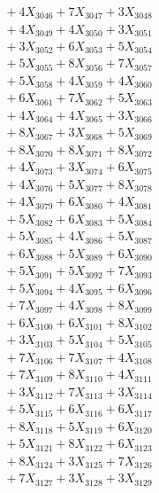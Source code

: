 \documentclass[a4paper,10pt]{article}
\begin{document}
{\begin{align}
&\;  + 4 X_{3046} + 7 X_{3047} + 3 X_{3048} \\[0.3ex]
&\;  + 4 X_{3049} + 4 X_{3050} + 3 X_{3051} \\[0.3ex]
&\;  + 3 X_{3052} + 6 X_{3053} + 5 X_{3054} \\[0.3ex]
&\;  + 5 X_{3055} + 8 X_{3056} + 7 X_{3057} \\[0.3ex]
&\;  + 5 X_{3058} + 4 X_{3059} + 4 X_{3060} \\[0.3ex]
&\;  + 6 X_{3061} + 7 X_{3062} + 5 X_{3063} \\[0.3ex]
&\;  + 4 X_{3064} + 4 X_{3065} + 3 X_{3066} \\[0.3ex]
&\;  + 8 X_{3067} + 3 X_{3068} + 5 X_{3069} \\[0.5ex]\allowbreak
&\;  + 8 X_{3070} + 8 X_{3071} + 8 X_{3072} \\[0.3ex]
&\;  + 4 X_{3073} + 3 X_{3074} + 6 X_{3075} \\[0.3ex]
&\;  + 4 X_{3076} + 5 X_{3077} + 8 X_{3078} \\[0.3ex]
&\;  + 4 X_{3079} + 6 X_{3080} + 4 X_{3081} \\[0.3ex]
&\;  + 5 X_{3082} + 6 X_{3083} + 5 X_{3084} \\[0.3ex]
&\;  + 5 X_{3085} + 4 X_{3086} + 5 X_{3087} \\[0.3ex]
&\;  + 6 X_{3088} + 5 X_{3089} + 6 X_{3090} \\[0.3ex]
&\;  + 5 X_{3091} + 5 X_{3092} + 7 X_{3093} \\[0.3ex]
&\;  + 5 X_{3094} + 4 X_{3095} + 6 X_{3096} \\[0.3ex]
&\;  + 7 X_{3097} + 4 X_{3098} + 8 X_{3099} \\[0.5ex]\allowbreak
&\;  + 6 X_{3100} + 6 X_{3101} + 8 X_{3102} \\[0.3ex]
&\;  + 3 X_{3103} + 5 X_{3104} + 5 X_{3105} \\[0.3ex]
&\;  + 7 X_{3106} + 7 X_{3107} + 4 X_{3108} \\[0.3ex]
&\;  + 7 X_{3109} + 8 X_{3110} + 4 X_{3111} \\[0.3ex]
&\;  + 3 X_{3112} + 7 X_{3113} + 3 X_{3114} \\[0.3ex]
&\;  + 5 X_{3115} + 6 X_{3116} + 6 X_{3117} \\[0.3ex]
&\;  + 8 X_{3118} + 5 X_{3119} + 6 X_{3120} \\[0.3ex]
&\;  + 5 X_{3121} + 8 X_{3122} + 6 X_{3123} \\[0.3ex]
&\;  + 8 X_{3124} + 3 X_{3125} + 7 X_{3126} \\[0.3ex]
&\;  + 7 X_{3127} + 3 X_{3128} + 3 X_{3129} \\[0.5ex]\allowbreak

\end{align}}
\end{document}
